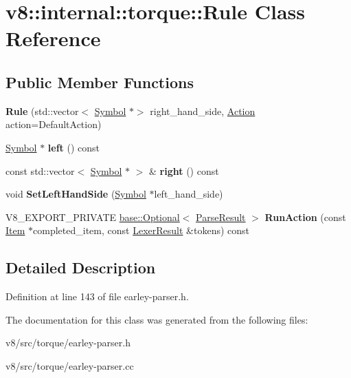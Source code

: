 \hypertarget{classv8_1_1internal_1_1torque_1_1Rule}{}\section{v8\+:\+:internal\+:\+:torque\+:\+:Rule Class Reference}
\label{classv8_1_1internal_1_1torque_1_1Rule}
\subsection*{Public Member Functions}
\begin{DoxyCompactItemize}
\item 
\mbox{\label{classv8_1_1internal_1_1torque_1_1Rule_a063cbf24cd74f80d2d33936780723ead}} 
{\bfseries Rule} (std\+::vector$<$ \mbox{\hyperlink{classv8_1_1internal_1_1torque_1_1Symbol}{Symbol}} $\ast$$>$ right\+\_\+hand\+\_\+side, \mbox{\hyperlink{classv8_1_1base_1_1Optional}{Action}} action=Default\+Action)
\item 
\mbox{\label{classv8_1_1internal_1_1torque_1_1Rule_a4162670df9ed34334fe58b588a8f5597}} 
\mbox{\hyperlink{classv8_1_1internal_1_1torque_1_1Symbol}{Symbol}} $\ast$ {\bfseries left} () const
\item 
\mbox{\label{classv8_1_1internal_1_1torque_1_1Rule_ac7d9c4928a6b1cf25efcc18b59436538}} 
const std\+::vector$<$ \mbox{\hyperlink{classv8_1_1internal_1_1torque_1_1Symbol}{Symbol}} $\ast$ $>$ \& {\bfseries right} () const
\item 
\mbox{\label{classv8_1_1internal_1_1torque_1_1Rule_a1e49d29ef75288577a7311a479b8d6bc}} 
void {\bfseries Set\+Left\+Hand\+Side} (\mbox{\hyperlink{classv8_1_1internal_1_1torque_1_1Symbol}{Symbol}} $\ast$left\+\_\+hand\+\_\+side)
\item 
\mbox{\label{classv8_1_1internal_1_1torque_1_1Rule_ac03ec44b771e80f1b7997dae6cf54138}} 
V8\+\_\+\+E\+X\+P\+O\+R\+T\+\_\+\+P\+R\+I\+V\+A\+TE \mbox{\hyperlink{classv8_1_1base_1_1Optional}{base\+::\+Optional}}$<$ \mbox{\hyperlink{classv8_1_1internal_1_1torque_1_1ParseResult}{Parse\+Result}} $>$ {\bfseries Run\+Action} (const \mbox{\hyperlink{classv8_1_1internal_1_1torque_1_1Item}{Item}} $\ast$completed\+\_\+item, const \mbox{\hyperlink{structv8_1_1internal_1_1torque_1_1LexerResult}{Lexer\+Result}} \&tokens) const
\end{DoxyCompactItemize}


\subsection{Detailed Description}


Definition at line 143 of file earley-\/parser.\+h.



The documentation for this class was generated from the following files\+:\begin{DoxyCompactItemize}
\item 
v8/src/torque/earley-\/parser.\+h\item 
v8/src/torque/earley-\/parser.\+cc\end{DoxyCompactItemize}
